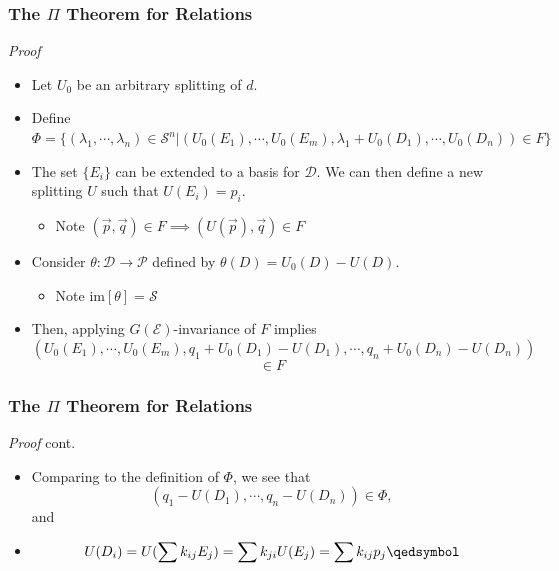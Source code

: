 \documentclass{beamer}
\begin{document}
\begin{frame}
    \frametitle{The $\Pi$ Theorem for Relations}
    \alert{\textit{Proof}}
    \begin{itemize}
        \item<2-> Let $U_0$ be an arbitrary splitting of $d$.
        \item<3-> Define $\Phi = \{ (\lambda_1, \cdots, \lambda_n) \in \mathcal{S}^n | (U_0(E_1), \cdots, U_0(E_m), \lambda_1 + U_0(D_1), \cdots, U_0(D_n)) \in F \}$
        \item<4-> The set $\{E_i\}$ can be extended to a basis for $\mathcal{D}$. We can then define a new splitting $U$ such that $U(E_i) = p_i$.
        \begin{itemize}
            \item<5-> Note $(\vec{p}, \vec{q}) \in F \implies (U(\vec{p}), \vec{q}) \in F$
        \end{itemize}
        \item<6-> Consider $\theta:\mathcal{D}\rightarrow\mathcal{P}$ defined by $\theta(D) = U_0(D) - U(D)$.
        \begin{itemize}
            \item<7-> Note $\text{im}[\theta] = \mathcal{S}$
        \end{itemize}
        \item<8-> Then, applying $G(\mathcal{E})$-invariance of $F$ implies \[ (U_0(E_1), \cdots, U_0(E_m), q_1 + U_0(D_1) - U(D_1), \cdots, q_n + U_0(D_n) - U(D_n)) \] \[ \in F \] 
    \end{itemize}
\end{frame}

\begin{frame}
    \frametitle{The $\Pi$ Theorem for Relations}
    \alert{\textit{Proof} cont.}
    \begin{itemize}
        \item<2-> Comparing to the definition of $\Phi$, we see that \[ (q_1 - U(D_1), \cdots, q_n - U(D_n)) \in \Phi, \] and
        \item<3-> \[ U(D_i) = U(\sum k_{ij}E_j) = \sum k_{ji}U(E_j) = \sum k_{ij}p_j \qedsymbol \]
    \end{itemize}
\end{frame}
\end{document}
